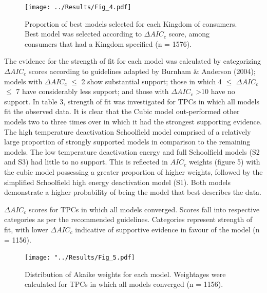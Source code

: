 \documentclass[11pt]{article}
\begin{document}
\begin{linenumbers}
\begin{figure}[H]	\texttt{[image: ../Results/Fig\_4.pdf]}
	\centering
	\caption{Proportion of  best models selected for each Kingdom of consumers. Best model was selected according to \(\Delta AIC_c\) score, among consumers that had a Kingdom specified (n = 1576).}
\end{figure}


The evidence for the strength of fit for each model was calculated by categorizing \(\Delta AIC_c\) scores according to guidelines adapted by Burnham \& Anderson (2004); models with \(\Delta AIC_c\) $\leq$ 2 show substantial support; those in which 4 $\leq$ \(\Delta AIC_c\) $\leq$ 7 have considerably less support; and those with \(\Delta AIC_c\) \textgreater 10 have no support. In table 3, strength of fit was investigated for TPCs in which all models fit the observed data. It is clear that the Cubic model out-performed other models two to three times over in which it had the strongest supporting evidence. The high temperature deactivation Schoolfield model comprised of a relatively large proportion of strongly supported models in comparison to the remaining models. The low temperature deactivation energy and full Schoolfield models (S2 and S3) had little to no support. This is reflected in \(AIC_c\) weights (figure 5) with the cubic model possessing a greater proportion of higher weights, followed by the simplified Schoolfield high energy deactivation model (S1). Both models demonstrate a higher probability of being the model that best describes the data.

\vspace{0.7cm}
\begin{table}[H]
	\FloatBarrier
	\caption{\(\Delta AIC_c\) scores for TPCs in which all models converged.  Scores fall into respective categories as per the recommended guidelines. Categories represent strength of fit, with lower \(\Delta AIC_c\) indicative of supportive evidence in favour of the model (n = 1156).}
\begin{adjustbox}{height = 2.7cm, width=15cm}
		\centering
	
	\FloatBarrier
\end{adjustbox}
\end{table}




\begin{figure}[H]
	\texttt{[image: "../Results/Fig\_5.pdf]}
	\centering
	\caption{Distribution of Akaike weights for each model. Weightages were calculated for TPCs in which all models converged (n = 1156).}
\end{figure}


\end{linenumbers}
\end{document}
